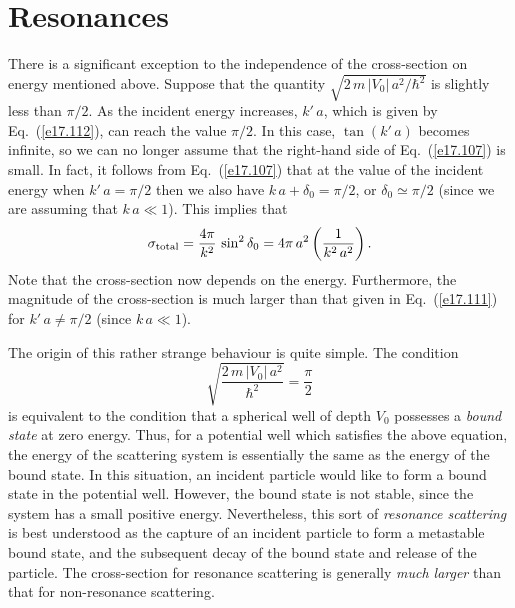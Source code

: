 \section{Resonances}
There is a significant exception to the independence of the cross-section on energy mentioned above. Suppose that the quantity $\sqrt{2\,m \,|V_0|\,a^2/\hbar^2}$
is slightly less than $\pi/2$. As the incident energy increases, $k'\,a$,
which is given by Eq.~(\ref{e17.112}), can reach the value $\pi/2$. In this case,
$\tan (k'\,a)$ becomes infinite, so we can no longer assume that the right-hand side of Eq.~(\ref{e17.107}) is small. In fact, it follows from Eq.~(\ref{e17.107}) that
at the value of the incident energy
when $k'\,a = \pi/2$ then we also have $k\,a+\delta_0 = \pi/2$,
or $\delta_0 \simeq \pi/2$ (since we are assuming that $k\,a\ll 1$). 
This implies that
\begin{equation}
\sigma_{\rm total} = \frac{4\pi}{k^2} \,\sin^2\delta_0 = 4\pi \,a^2
\left(\frac{1}{k^2 \,a^2}\right).
\end{equation}
Note that the cross-section now depends on the energy. Furthermore, the
magnitude of the cross-section is much larger than that given in Eq.~(\ref{e17.111})
for $k'\,a\neq \pi/2$ (since $k\,a\ll 1$). 

The origin of this rather strange behaviour is quite simple. The condition
\begin{equation}
\sqrt{\frac{2\,m\,|V_0 |\,a^2}{\hbar^2} } = \frac{\pi}{2}
\end{equation}
is equivalent to the condition that a spherical well of depth
$V_0$ possesses a {\em bound state}\/ at zero energy. Thus, for a potential
well which satisfies the above equation, the energy of the scattering system
is essentially the same as the energy of the bound state. In this situation,
an incident particle would like to form a bound state in the potential
well. However, the bound state is not stable, since the system has a small
positive energy. Nevertheless, this sort of {\em resonance scattering}\/
is best understood as the capture of an incident particle to form
a metastable bound state, and the subsequent decay of the bound state
and release of the particle. The cross-section for resonance scattering
is generally {\em much larger}\/ than that for non-resonance scattering.

